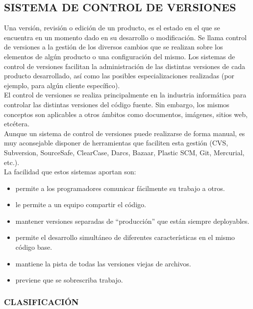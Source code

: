 \subsection{SISTEMA DE CONTROL DE VERSIONES}

Una versión, revisión o edición de un producto, es el estado en el que se encuentra en un momento dado en su desarrollo o modificación. Se llama control de versiones a la gestión de los diversos cambios que se realizan sobre los elementos de algún producto o una configuración del mismo. Los sistemas de control de versiones facilitan la administración de las distintas versiones de cada producto desarrollado, así como las posibles especializaciones realizadas (por ejemplo, para algún cliente específico).\\

El control de versiones se realiza principalmente en la industria informática para controlar las distintas versiones del código fuente. Sin embargo, los mismos conceptos son aplicables a otros ámbitos como documentos, imágenes, sitios web, etcétera.\\

Aunque un sistema de control de versiones puede realizarse de forma manual, es muy aconsejable disponer de herramientas que faciliten esta gestión (CVS, Subversion, SourceSafe, ClearCase, Darcs, Bazaar, Plastic SCM, Git, Mercurial, etc.).\\

La facilidad que estos sistemas aportan son:
\begin{itemize}
\item permite a los programadores comunicar fácilmente su trabajo a otros.
\item le permite a un equipo compartir el código.
\item mantener versiones separadas de “producción” que están siempre deployables.
\item permite el desarrollo simultáneo de diferentes características en el mismo código base.
\item mantiene la pista de todas las versiones viejas de archivos.
\item previene que se sobrescriba trabajo.
\end{itemize}


\subsubsection{CLASIFICACIÓN}

